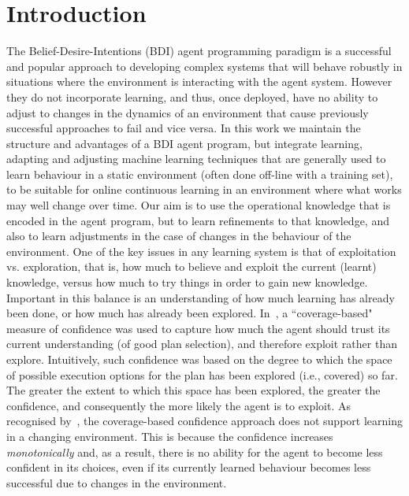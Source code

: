 \section{Introduction}\label{sec:introduction}


The Belief-Desire-Intentions (BDI) agent programming paradigm
\cite{Georgeff89-PRS,Rao96:AgentSpeak,WooldridgeBook} is a
successful and popular approach to developing complex systems that
will behave robustly in situations where the environment is
interacting with the agent system.
However they do not incorporate learning, and thus, once deployed,
have no ability to adjust to changes in the dynamics of an environment
that cause previously successful approaches to fail and vice versa.
In this work we maintain the structure and advantages of a BDI agent
program, but integrate learning, adapting and adjusting machine
learning techniques that are generally used to learn behaviour in a
static environment (often done off-line with a training set), to be
suitable for online continuous learning in an environment where what
works may well change over time.
Our aim is to use the operational knowledge that is encoded in the
agent program, but to learn refinements to that knowledge, and also to
learn adjustments in the case of changes in the behaviour of the
environment. 
One of the key issues in any learning system is that of exploitation
vs. exploration, that is, how much to believe and exploit the current
(learnt) knowledge, versus how much to try things in order to gain new
knowledge. Important in this balance is an understanding of how much
learning has already been done, or how much has already been
explored. In~\cite{singh10:extending,singh10:learning}, a
``coverage-based" measure of confidence was used to capture how much
the agent should trust its current understanding (of good plan
selection), and therefore exploit rather than explore. Intuitively,
such confidence was based on the degree to which the space of possible
execution options for the plan has been explored (i.e., covered) so
far. The greater the extent to which this space has been explored, the
greater the confidence, and consequently the more likely the agent is
to exploit.   
%
As recognised by~\cite{singh10:learning}, the coverage-based
confidence approach does not support learning in a changing
environment. This is because the confidence increases
\emph{monotonically} and, as a result, there is no ability for the
agent to become less confident in its choices, even if its currently
learned behaviour becomes less successful due to changes in the
environment. 

